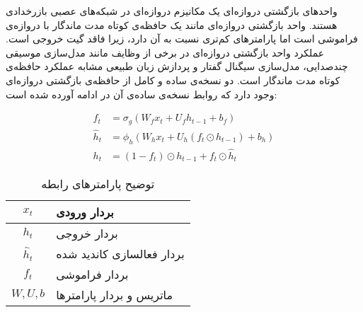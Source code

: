 
واحدهای بازگشتی دروازه‌ای یک مکانیزم دروازه‌ای در شبکه‌های عصبی بازرخدادی هستند.
واحد بازگشتی دروازه‌ای مانند یک حافظه‌ی کوتاه مدت ماندگار با دروازه‌ی فراموشی است اما پارامترهای کم‌تری نسبت به آن دارد، زیرا فاقد گیت خروجی است.
عملکرد واحد بازگشتی دروازه‌ای در برخی از وظایف مانند مدل‌سازی موسیقی چندصدایی، مدل‌سازی سیگنال گفتار و پردازش زبان طبیعی مشابه عملکرد حافظه‌ی کوتاه مدت ماندگار است.
دو نسخه‌ی ساده و کامل از حافظه‌ی بازگشتی دروازه‌ای وجود دارد که روابط نسخه‌ی ساده‌ی آن در ادامه آورده شده است:

\begin{equation}
  \label{eq:gru}
  \begin{aligned}
  f_{t}& = \sigma _{g} ( W_{f} x_{t} + U_{f} h_{t-1} + b_{f} )\\
  {\hat {h}}_{t}& = \phi _{h}(W_{h}x_{t}+U_{h}(f_{t}\odot h_{t-1})+b_{h})\\
  h_{t}& = (1-f_{t})\odot h_{t-1}+f_{t}\odot {\hat {h}}_{t}
  \end{aligned}
\end{equation}

\begin{table}[h]
  \centering
  \caption{توضیح پارامترهای رابطه }
  \begin{tabular}{|c|p{}|}
    \hline
    $x_{t}$ & بردار ورودی \\
    \hline
    $h_{t}$ & بردار خروجی \\
    \hline
    ${\hat {h}}_{t}$ & بردار فعالسازی کاندید شده \\
    \hline
    $f_{t}$ & بردار فراموشی \\
    \hline
    $W, U ,b$ & ماتریس و بردار پارامترها \\
    \hline
  \end{tabular}
  \label{tbl:distance}
\end{table}
